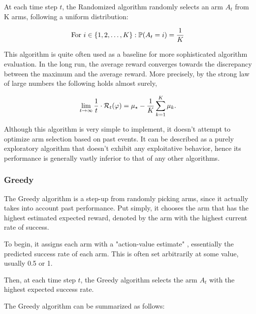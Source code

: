 At each time step $t$, the Randomized algorithm randomly selects an arm $A_t$ from K arms, following a uniform distribution:

$$\text{For } i \in \{1, 2, \ldots, K\}: \mathbb{P}(A_t = i) = \frac{1}{K}$$

This algorithm is quite often used as a baseline for more sophisticated algorithm evaluation. In the long run, the average reward converges towards the discrepancy between the maximum and the average reward. More precisely, by the strong law of large numbers the following holds almost surely,

$$\lim_{{t \to \infty}} \frac{1}{t}\cdot \mathcal{R}_{t}(\varphi) = \mu_{\star}-\frac{1}{K} \sum_{{k=1}}^{K} \mu_{k}.$$

Although this algorithm is very simple to implement, it doesn't attempt to optimize arm selection based on past events. It can be described as a purely exploratory algorithm that doesn't exhibit any exploitative behavior, hence its performance is generally vastly inferior to that of any other algorithms.

\subsubsection{Greedy}
\label{sec:Greedy}
The Greedy algorithm is a step-up from randomly picking arms, since it actually takes into account past performance. Put simply, it chooses the arm that has the highest estimated expected reward, denoted by the arm with the highest current rate of success.

To begin, it assigns each arm with a "action-value estimate" \actionValueEstimate, essentially the predicted success rate of each arm. This is often set arbitrarily at some value, usually 0.5 or 1.

Then, at each time step $t$, the Greedy algorithm selects the arm $A_t$ with the highest expected success rate.

The Greedy algorithm can be summarized as follows:


